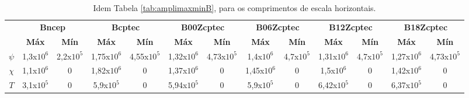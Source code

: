 \begin{table}[H]
\caption{Idem Tabela \ref{tab:amplimaxminB}, para os comprimentos de escala horizontais.}
\begin{center}
\begin{adjustbox}{max width=\textwidth}
\begin{tabular}{ccccccccccccc}
\toprule
\toprule
\multicolumn{1}{c}{} & \multicolumn{2}{c}{\textbf{Bncep}} & \multicolumn{2}{c}{\textbf{Bcptec}} & \multicolumn{2}{c}{\textbf{B00Zcptec}} &\multicolumn{2}{c}{\textbf{B06Zcptec}} & \multicolumn{2}{c}{\textbf{B12Zcptec}} & \multicolumn{2}{c}{\textbf{B18Zcptec}} \\
\cmidrule(lr){2-3} \cmidrule(lr){4-5} \cmidrule(lr){6-7} \cmidrule(lr){8-9} \cmidrule(lr){10-11} \cmidrule(lr){12-13}
\multicolumn{1}{c}{} & \multicolumn{1}{c}{\textbf{Máx}} & \multicolumn{1}{c}{\textbf{Mín}} & \multicolumn{1}{c}{\textbf{Máx}} & \multicolumn{1}{c}{\textbf{Mín}} & \multicolumn{1}{c}{\textbf{Máx}} & \multicolumn{1}{c}{\textbf{Mín}} & \multicolumn{1}{c}{\textbf{Máx}} & \multicolumn{1}{c}{\textbf{Mín}} & \multicolumn{1}{c}{\textbf{Máx}} & \multicolumn{1}{c}{\textbf{Mín}} & \multicolumn{1}{c}{\textbf{Máx}} & \multicolumn{1}{c}{\textbf{Mín}} \\
\midrule
\multicolumn{1}{c}{$\psi$} & \multicolumn{1}{c}{1,3x$10^{6}$} & \multicolumn{1}{c}{2,2x$10^{5}$} & \multicolumn{1}{c}{1,75x$10^{6}$} & \multicolumn{1}{c}{4,55x$10^{5}$} & \multicolumn{1}{c}{1,32x$10^{6}$} & \multicolumn{1}{c}{4,73x$10^{5}$} & \multicolumn{1}{c}{1,4x$10^{6}$} & \multicolumn{1}{c}{4,7x$10^{5}$} & \multicolumn{1}{c}{1,31x$10^{6}$} & \multicolumn{1}{c}{4,7x$10^{5}$} & \multicolumn{1}{c}{1,27x$10^{6}$} & \multicolumn{1}{c}{4,73x$10^{5}$} \\ 
\multicolumn{1}{c}{$\chi$} & \multicolumn{1}{c}{1,1x$10^{6}$} & \multicolumn{1}{c}{0} & \multicolumn{1}{c}{1,82x$10^{6}$} & \multicolumn{1}{c}{0} & \multicolumn{1}{c}{1,37x$10^{6}$} & \multicolumn{1}{c}{0} & \multicolumn{1}{c}{1,45x$10^{6}$} & \multicolumn{1}{c}{0} & \multicolumn{1}{c}{1,5x$10^{6}$} & \multicolumn{1}{c}{0} & \multicolumn{1}{c}{1,42x$10^{6}$} & \multicolumn{1}{c}{0} \\ 
\multicolumn{1}{c}{$T$}    & \multicolumn{1}{c}{3,1x$10^{5}$} & \multicolumn{1}{c}{0} & \multicolumn{1}{c}{5,9x$10^{5}$} & \multicolumn{1}{c}{0} & \multicolumn{1}{c}{5,94x$10^{5}$} & \multicolumn{1}{c}{0} & \multicolumn{1}{c}{5,9x$10^{5}$} & \multicolumn{1}{c}{0} & \multicolumn{1}{c}{6,42x$10^{5}$} & \multicolumn{1}{c}{0} & \multicolumn{1}{c}{6,37x$10^{5}$} & \multicolumn{1}{c}{0} \\ 

\end{tabular}
\end{adjustbox}
\end{center}
\end{table}
